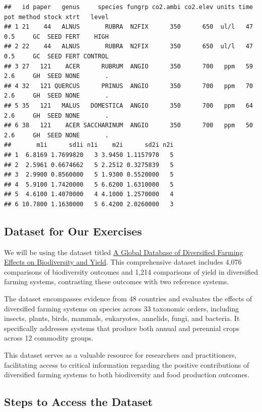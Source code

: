 \documentclass[
]{book}
\begin{document}
\begin{verbatim}
##   id paper   genus     species fungrp co2.ambi co2.elev units time pot method stock xtrt   level
## 1 21    44   ALNUS       RUBRA  N2FIX      350      650  ul/l   47 0.5     GC  SEED FERT    HIGH
## 2 22    44   ALNUS       RUBRA  N2FIX      350      650  ul/l   47 0.5     GC  SEED FERT CONTROL
## 3 27   121    ACER      RUBRUM  ANGIO      350      700   ppm   59 2.6     GH  SEED NONE       .
## 4 32   121 QUERCUS      PRINUS  ANGIO      350      700   ppm   70 2.6     GH  SEED NONE       .
## 5 35   121   MALUS   DOMESTICA  ANGIO      350      700   ppm   64 2.6     GH  SEED NONE       .
## 6 38   121    ACER SACCHARINUM  ANGIO      350      700   ppm   50 2.6     GH  SEED NONE       .
##       m1i      sd1i n1i    m2i      sd2i n2i
## 1  6.8169 1.7699820   3 3.9450 1.1157970   5
## 2  2.5961 0.6674662   5 2.2512 0.3275839   5
## 3  2.9900 0.8560000   5 1.9300 0.5520000   5
## 4  5.9100 1.7420000   5 6.6200 1.6310000   5
## 5  4.6100 1.4070000   4 4.1000 1.2570000   4
## 6 10.7800 1.1630000   5 6.4200 2.0260000   3
\end{verbatim}

\subsection{Dataset for Our Exercises}\label{dataset-for-our-exercises}

We will be using the dataset titled \href{https://www.nature.com/articles/s41597-021-01000-y}{A Global Database of Diversified Farming Effects on Biodiversity and Yield}.
This comprehensive dataset includes 4,076 comparisons of biodiversity outcomes and 1,214 comparisons of yield in diversified farming systems, contrasting these outcomes with two reference systems.

The dataset encompasses evidence from 48 countries and evaluates the effects of diversified farming systems on species across 33 taxonomic orders, including insects, plants, birds, mammals, eukaryotes, annelids, fungi, and bacteria.
It specifically addresses systems that produce both annual and perennial crops across 12 commodity groups.

This dataset serves as a valuable resource for researchers and practitioners, facilitating access to critical information regarding the positive contributions of diversified farming systems to both biodiversity and food production outcomes.

\subsection{Steps to Access the Dataset}\label{steps-to-access-the-dataset}
\end{document}
